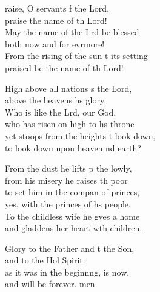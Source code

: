 \settowidth{\versewidth}{From the rising of the sun to its setting *}
\begin{psalmverse}%
  \begin{patverse}
raise, O servants f the Lord,\Med\\
praise the name of th Lord!\\
May the name of the Lrd be blessed\Med\\
both now and for evrmore!\\
From the rising of the sun t its setting\Med\\
praised be the name of th Lord!

High above all nations \pointup{\i}s the Lord,\Med\\
above the heavens h\pointup{\i}s glory.\\
Who is like the Lrd, our God,\Med\\
who has risen on high to h\pointup{\i}s throne\\
yet stoops from the heights t look down,\Med\\
to look down upon heaven nd earth?

From the dust he lifts p the lowly,\Med\\
from his misery he raises th poor\\
to set him in the compan of princes,\Med\\
yes, with the princes of h\pointup{\i}s people.\\
To the childless wife he g\pointup{\i}ves a home\Med\\
and gladdens her heart w\pointup{\i}th children.

Glory to the Father and t the Son,\Med\\
and to the Hol Spirit:\\
as it was in the beginn\pointup{\i}ng, is now,\Med\\
and will be forever. men.
  \end{patverse}
\end{psalmverse}

